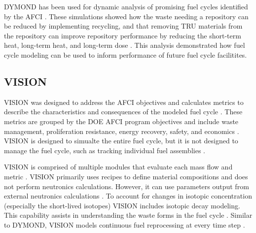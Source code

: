 \documentclass{article}
\begin{document}
    \gls{DYMOND} has been used for dynamic analysis of promising fuel cycles 
    identified by the AFCI \cite{yacout_dynamic_2000}. These simulations 
    showed how the waste needing a repository can be reduced by implementing 
    recycling, and that removing \gls{TRU} materials from the repository 
    can improve repository performance by reducing the short-term heat, 
    long-term heat, and long-term dose \cite{yacout_dynamic_2000}. This 
    analysis demonstrated how fuel cycle modeling can be used to inform  
    performance of future fuel cycle facilitites. 

\subsection{VISION}
    \Ac{VISION} was designed to address the AFCI objectives \cite{yacout_visionverifiable_2006}
    and calculates metrics to describe the characteristics and 
    consequences of the modeled fuel cycle \cite{yacout_visionverifiable_2006}. 
    These metrics are grouped by the \gls{DOE} AFCI program objectives and include 
    waste management, proliferation resistance, energy recovery, safety, 
    and economics \cite{yacout_visionverifiable_2006}. \gls{VISION} is designed 
    to simualte the entire fuel cycle, but it is not designed to manage the 
    fuel cycle, such as tracking individual fuel assemblies 
    \cite{yacout_visionverifiable_2006}.

    \gls{VISION} is comprised of multiple modules that evaluate each mass flow and 
    metric \cite{yacout_visionverifiable_2006}. \gls{VISION} primarily uses 
    recipes to define material compositions and does not perform
    neutronics calculations. However, it can use parameters output from external 
    neutronics calculations \cite{yacout_visionverifiable_2006}. To account 
    for changes in isotopic concentration (especially the short-lived 
    isotopes) \gls{VISION} includes isotopic decay modeling. This capability 
    assists in 
    understanding the waste forms in the fuel cycle \cite{yacout_visionverifiable_2006}.
    Similar to \gls{DYMOND}, \gls{VISION} models continuous fuel reprocessing at 
    every time step \cite{feng_standardized_2016}. 
\end{document}
